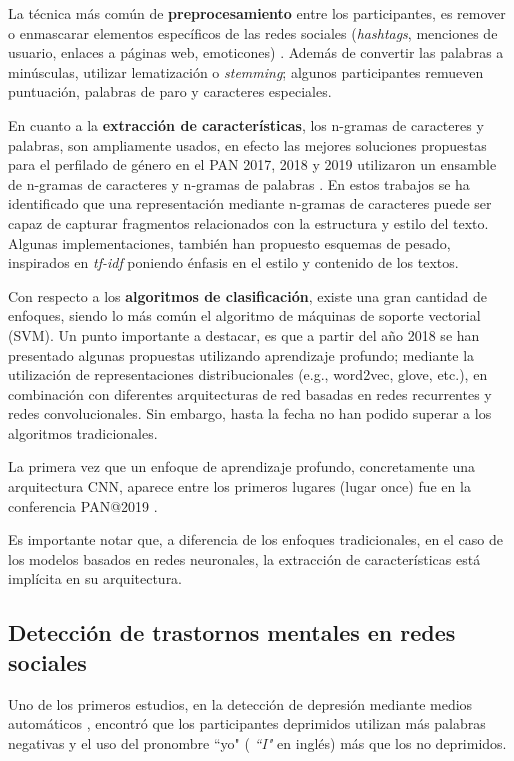 La técnica más común de \textbf{preprocesamiento} entre los participantes, es remover o enmascarar elementos específicos de las redes sociales (\textit{hashtags}, menciones de usuario, enlaces a páginas web, emoticones) \citep{daneshvar2018gender, jimenez2019bots, Pizarro2019}. Además de convertir las palabras a minúsculas, utilizar lematización o \textit{stemming}; algunos participantes remueven puntuación, palabras de paro y caracteres especiales.

En cuanto a la \textbf{extracción de características}, los n-gramas de caracteres y palabras, son ampliamente usados, en efecto las mejores soluciones propuestas para el perfilado de género en el PAN 2017, 2018 y 2019 utilizaron un ensamble de n-gramas de caracteres y n-gramas de palabras \citep{basile2017there, daneshvar2018gender, Pizarro2019}. En estos trabajos se ha identificado que una representación mediante n-gramas de caracteres puede ser capaz de capturar fragmentos relacionados con la estructura y estilo del texto. Algunas implementaciones, también han propuesto esquemas de pesado, inspirados en \textit{tf-idf} poniendo énfasis en el estilo y contenido de los textos.

Con respecto a los \textbf{algoritmos de clasificación}, existe una gran cantidad de enfoques, siendo lo más común el algoritmo de máquinas de soporte vectorial (SVM). Un punto importante a destacar, es que a partir del año 2018 se han presentado algunas propuestas utilizando aprendizaje profundo; mediante la utilización de representaciones distribucionales (e.g., word2vec, glove, etc.), en combinación con diferentes arquitecturas de red basadas en redes recurrentes y redes convolucionales. Sin embargo, hasta la fecha no han podido superar a los algoritmos tradicionales.


La primera vez que un enfoque de aprendizaje profundo, concretamente una arquitectura CNN, aparece entre los primeros lugares (lugar once) fue en la conferencia PAN@2019 \citep{Rangel2019}. 

Es importante notar que, a diferencia de los enfoques tradicionales, en el caso de los modelos basados en redes neuronales, la extracción de características está implícita en su arquitectura.

\subsection{Detección de trastornos mentales en redes sociales}

Uno de los primeros estudios, en la detección de depresión mediante medios automáticos \citep{rude2004language}, encontró que los participantes deprimidos utilizan más palabras negativas y el uso del pronombre ``yo" ( \textit{``I"} en inglés) más que los no deprimidos. 

